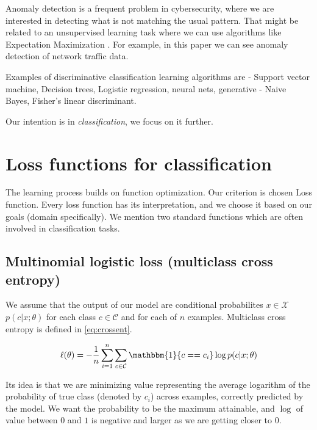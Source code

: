 Anomaly detection is a frequent problem in cybersecurity, where we are interested in detecting what is not matching the usual pattern. That might be related to an unsupervised learning task where we can use algorithms like Expectation Maximization \cite{Dempster1977}. For example, in this paper \cite{IglesiasVazquez2014} we can see anomaly detection of network traffic data.

Examples of discriminative classification learning algorithms are - Support vector machine, Decision trees, Logistic regression, neural nets, generative - Naive Bayes, Fisher's linear discriminant.

Our intention is in \emph{classification}, we focus on it further.


\section{Loss functions for classification}
The learning process builds on function optimization. Our criterion is chosen Loss function. Every loss function has its interpretation, and we choose it based on our goals (domain specifically). We mention two standard functions which are often involved in classification tasks.

\subsection{Multinomial logistic loss (multiclass cross entropy)} 
We assume that the output of our model are conditional probabilites  $x \in \mathcal{X}$  $p(c|x;\theta)$ for each class $c \in \mathcal{C}$ and for each of $n$ examples.
Multiclass cross entropy is defined in \ref{eq:crossent}. 

\begin{equation} \label{eq:crossent}
    \ell(\theta)=-\frac{1}{n}\sum_{i=1}^{n}\sum_{c \in \mathcal{C}}\mathbbm{1}\{c==c_i\}\log p(c|x;\theta)
\end{equation}

Its idea is that we are minimizing value representing the average logarithm of the probability of true class (denoted by $c_i$) across examples, correctly predicted by the model. We want the probability to be the maximum attainable, and $\log$ of value between $0$ and $1$ is negative and larger as we are getting closer to $0$. 


